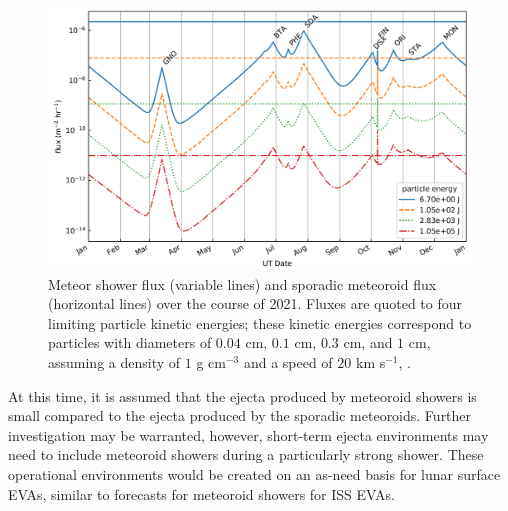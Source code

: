 \documentclass{article}
\begin{document}
\begin{figure}[!htb]
	\centering
	\includegraphics[width=1.0\linewidth]{../ShowerForecast/2021_forecast_showers_southpole_moon.PNG}
	\caption{Meteor shower flux (variable lines) and sporadic meteoroid flux (horizontal lines) over the course of 2021. Fluxes are quoted to four limiting particle kinetic energies; these kinetic energies correspond to particles with diameters of $0.04$ cm, $0.1$ cm, $0.3$ cm, and $1$ cm, assuming a density of $1$ g cm$^{-3}$ and a speed of $20$ km s$^{-1}$, \citep[see Figure 1,][]{moorhead2020southpoleshower}.}\label{fig:2021_forecast_showers_southpole_moon}
\end{figure}

At this time, it is assumed that the ejecta produced by meteoroid showers is small compared to the ejecta produced by the sporadic meteoroids. Further investigation may be warranted, however, short-term ejecta environments may need to include meteoroid showers during a particularly strong shower. These operational environments would be created on an as-need basis for lunar surface EVAs, similar to forecasts for meteoroid showers for ISS EVAs.

\clearpage
\end{document}
